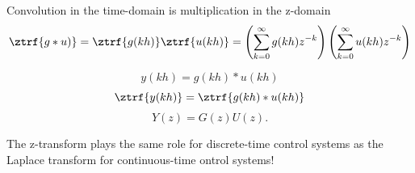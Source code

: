 \documentclass[presentation,aspectratio=169]{beamer}
\begin{document}
\begin{frame}[label=sec-6-4]{Convolution in the time-domain is multiplication in the z-domain}
\[ \ztrf{g \ast u)} = \ztrf{g(kh)} \ztrf{u(kh)} = \left(\sum_{k=0}^{\infty} g(kh)z^{-k}\right) \left(\sum_{k=0}^{\infty} u(kh)z^{-k}\right)\]


\begin{center}
\end{center}
\[ y(kh) = g(kh) \ast u(kh) \]
\[ \ztrf{y(kh)} = \ztrf{g(kh) \ast u(kh)} \]
\[ Y(z) = G(z) U(z). \]

The z-transform plays the same role for discrete-time control  systems as the Laplace transform for continuous-time ontrol systems!
\end{frame}
\end{document}
